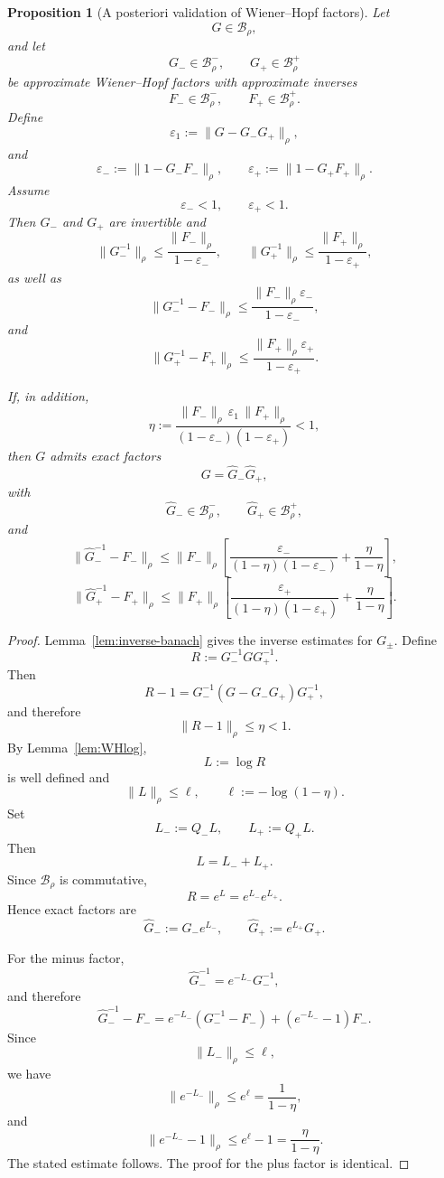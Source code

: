 \documentclass[11pt,a4paper]{amsart}
\newtheorem{proposition}[theorem]{Proposition}
\begin{document}
\begin{proposition}[A posteriori validation of Wiener--Hopf factors]
	\label{prop:WH-validation}
	Let
	\[
	G\in\mathcal B_\rho,
	\]
	and let
	\[
	G_-\in\mathcal B_\rho^-,
	\qquad
	G_+\in\mathcal B_\rho^+
	\]
	be approximate Wiener--Hopf factors with approximate inverses
	\[
	F_-\in\mathcal B_\rho^-,
	\qquad
	F_+\in\mathcal B_\rho^+.
	\]
	Define
	\[
	\varepsilon_1
	:=
	\|G-G_-G_+\|_\rho,
	\]
	and
	\[
	\varepsilon_-
	:=
	\|1-G_-F_-\|_\rho,
	\qquad
	\varepsilon_+
	:=
	\|1-G_+F_+\|_\rho.
	\]
	Assume
	\[
	\varepsilon_-<1,
	\qquad
	\varepsilon_+<1.
	\]
	Then $G_-$ and $G_+$ are invertible and
	\[
	\|G_-^{-1}\|_\rho
	\le
	\frac{\|F_-\|_\rho}{1-\varepsilon_-},
	\qquad
	\|G_+^{-1}\|_\rho
	\le
	\frac{\|F_+\|_\rho}{1-\varepsilon_+},
	\]
	as well as
	\[
	\|G_-^{-1}-F_-\|_\rho
	\le
	\frac{\|F_-\|_\rho\varepsilon_-}{1-\varepsilon_-},
	\]
	and
	\[
	\|G_+^{-1}-F_+\|_\rho
	\le
	\frac{\|F_+\|_\rho\varepsilon_+}{1-\varepsilon_+}.
	\]
	
	If, in addition,
	\[
	\eta
	:=
	\frac{
		\|F_-\|_\rho\,
		\varepsilon_1\,
		\|F_+\|_\rho
	}{
		(1-\varepsilon_-)(1-\varepsilon_+)
	}
	<1,
	\]
	then $G$ admits exact factors
	\[
	G=\widehat G_-\widehat G_+,
	\]
	with
	\[
	\widehat G_-\in\mathcal B_\rho^-,
	\qquad
	\widehat G_+\in\mathcal B_\rho^+,
	\]
	and
	\[
	\|\widehat G_-^{-1}-F_-\|_\rho
	\le
	\|F_-\|_\rho
	\left[
	\frac{\varepsilon_-}
	{(1-\eta)(1-\varepsilon_-)}
	+
	\frac{\eta}{1-\eta}
	\right],
	\]
	\[
	\|\widehat G_+^{-1}-F_+\|_\rho
	\le
	\|F_+\|_\rho
	\left[
	\frac{\varepsilon_+}
	{(1-\eta)(1-\varepsilon_+)}
	+
	\frac{\eta}{1-\eta}
	\right].
	\]
\end{proposition}

\begin{proof}
	Lemma~\ref{lem:inverse-banach} gives the inverse estimates for
	$G_\pm$. Define
	\[
	R:=G_-^{-1}GG_+^{-1}.
	\]
	Then
	\[
	R-1
	=
	G_-^{-1}
	(G-G_-G_+)
	G_+^{-1},
	\]
	and therefore
	\[
	\|R-1\|_\rho\le\eta<1.
	\]
	By Lemma~\ref{lem:WHlog},
	\[
	L:=\log R
	\]
	is well defined and
	\[
	\|L\|_\rho
	\le
	\ell,
	\qquad
	\ell:=-\log(1-\eta).
	\]
	Set
	\[
	L_-:=Q_-L,
	\qquad
	L_+:=Q_+L.
	\]
	Then
	\[
	L=L_-+L_+.
	\]
	Since $\mathcal B_\rho$ is commutative,
	\[
	R=e^L=e^{L_-}e^{L_+}.
	\]
	Hence exact factors are
	\[
	\widehat G_-:=G_-e^{L_-},
	\qquad
	\widehat G_+:=e^{L_+}G_+.
	\]
	
	For the minus factor,
	\[
	\widehat G_-^{-1}
	=
	e^{-L_-}G_-^{-1},
	\]
	and therefore
	\[
	\widehat G_-^{-1}-F_-
	=
	e^{-L_-}(G_-^{-1}-F_-)
	+
	(e^{-L_-}-1)F_-.
	\]
	Since
	\[
	\|L_-\|_\rho\le\ell,
	\]
	we have
	\[
	\|e^{-L_-}\|_\rho
	\le
	e^\ell
	=
	\frac1{1-\eta},
	\]
	and
	\[
	\|e^{-L_-}-1\|_\rho
	\le
	e^\ell-1
	=
	\frac{\eta}{1-\eta}.
	\]
	The stated estimate follows. The proof for the plus factor is
	identical.
\end{proof}
\end{document}

